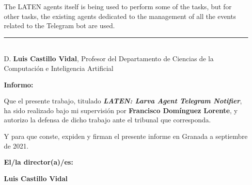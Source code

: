 	The LATEN agents itself is being used to perform some of the tasks, but for other tasks, the existing agents dedicated to the management of all the events related to the Telegram bot are used.\\

\cleardoublepage

\thispagestyle{empty}

\noindent\rule[-1ex]{\textwidth}{2pt}\\[4.5ex]

D. \textbf{Luis Castillo Vidal}, Profesor del Departamento de Ciencias de la Computación e Inteligencia Artificial

\vspace{0.5cm}

\textbf{Informo:}

\vspace{0.5cm}

Que el presente trabajo, titulado \textit{\textbf{LATEN: Larva Agent Telegram Notifier}},
ha sido realizado bajo mi supervisión por \textbf{Francisco Domínguez Lorente}, y autorizo la defensa de dicho trabajo ante el tribunal
que corresponda.

\vspace{0.5cm}

Y para que conste, expiden y firman el presente informe en Granada a septiembre de 2021.

\vspace{1cm}

\textbf{El/la director(a)/es: }

\vspace{5cm}

\noindent \textbf{Luis Castillo Vidal}